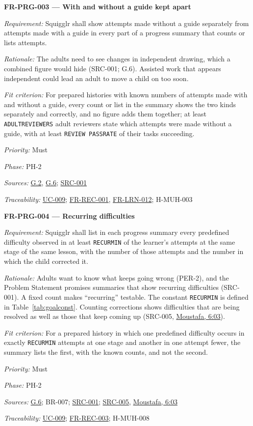 \documentclass[12pt]{article}
\renewcommand{\_}{\textunderscore\allowbreak}%
\newcommand{\intlink}[3]{\hyperref[int:#1-#2]{#3}}
\newcommand{\intref}[2]{\intlink{#1}{#2}{#1, #2}}
\newcommand{\goalref}[1]{\hyperref[goal:#1]{G.#1}}
\newcommand{\ucref}[1]{\hyperref[uc:#1]{\mbox{UC-#1}}}
\newenvironment{srsrequirement}[2]{%
  \par\medskip\noindent\phantomsection\label{req:#1}%
  \textbf{#1 --- #2}\par\nobreak\smallskip }{\par\medskip}
\newcommand{\reqfield}[2]{\noindent\textit{#1:} #2\par}
\newcommand{\reqshall}[1]{\reqfield{Requirement}{#1}}
\newcommand{\reqrationale}[1]{\reqfield{Rationale}{#1}}
\newcommand{\reqfit}[1]{\reqfield{Fit criterion}{#1}}
\newcommand{\reqpriority}[1]{\reqfield{Priority}{#1}}
\newcommand{\reqphase}[1]{\reqfield{Phase}{#1}}
\newcommand{\reqsources}[1]{\reqfield{Sources}{#1}}
\newcommand{\reqtraces}[1]{\reqfield{Traceability}{#1}}
\newcommand{\reqref}[1]{\hyperref[req:#1]{#1}}
\newcommand{\srcref}[1]{\hyperref[src:#1]{SRC-#1}}
\providecommand{\ucref}[1]{\hyperref[uc:#1]{UC-#1}}
\begin{document}
\begin{srsrequirement}{FR-PRG-003}{With and without a guide kept apart}
  \reqshall{Squigglr shall show attempts made without a guide separately from
attempts made with a guide in every part of a progress summary that counts or
lists attempts.} \reqrationale{The adults need to see changes in independent
drawing, which a combined figure would hide (SRC-001; G.6). Assisted work that
appears independent could lead an adult to move a child on too soon.}
\reqfit{For prepared histories with known numbers of attempts made with and
without a guide, every count or list in the summary shows the two kinds
separately and correctly, and no figure adds them together; at least
\texttt{ADULT\_\allowbreak REVIEWERS} adult reviewers state which attempts were
made without a guide, with at least \texttt{REVIEW\_\allowbreak
PASS\_\allowbreak RATE} of their tasks succeeding.}
  \reqpriority{Must}
  \reqphase{PH-2}
  \reqsources{\goalref{2}, \goalref{6}; \srcref{001}} \reqtraces{\ucref{009};
  \reqref{FR-REC-001}, \reqref{FR-LRN-012}; H-MUH-003}
\end{srsrequirement}

\begin{srsrequirement}{FR-PRG-004}{Recurring difficulties}
  \reqshall{Squigglr shall list in each progress summary every predefined
difficulty observed in at least \texttt{RECUR\_\allowbreak MIN} of the learner's
attempts at the same stage of the same lesson, with the number of those attempts
and the number in which the child corrected it.} \reqrationale{Adults want to
know what keeps going wrong (PER-2), and the Problem Statement promises
summaries that show recurring difficulties (SRC-001). A fixed count makes
``recurring'' testable. The constant \texttt{RECUR\_\allowbreak MIN} is defined
in Table~\ref{tab:goalconst}. Counting corrections shows difficulties that are
being resolved as well as those that keep coming up (SRC-005,
\intref{Moustafa}{6:03}).} \reqfit{For a prepared history in which one
predefined difficulty occurs in exactly \texttt{RECUR\_\allowbreak MIN} attempts
at one stage and another in one attempt fewer, the summary lists the first, with
the known counts, and not the second.}
  \reqpriority{Must}
  \reqphase{PH-2}
  \reqsources{\goalref{6}; BR-007; \srcref{001}; \srcref{005},
\intref{Moustafa}{6:03}} \reqtraces{\ucref{009}; \reqref{FR-REC-003}; H-MUH-008}
\end{srsrequirement}
\end{document}
